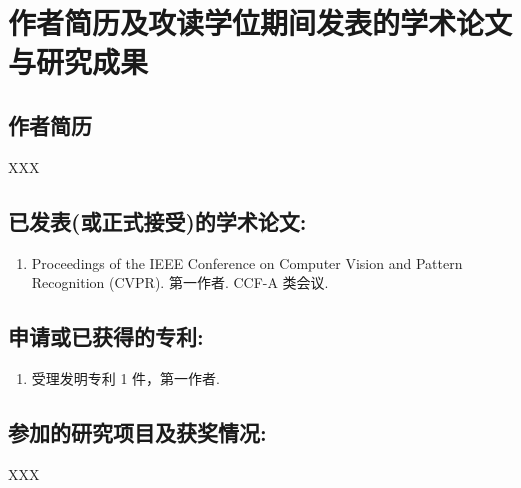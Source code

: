 \chapter{作者简历及攻读学位期间发表的学术论文与研究成果}

\section*{作者简历}
XXX

\section*{已发表(或正式接受)的学术论文:}
{
\setlist[enumerate]{}
\begin{enumerate}[nosep]
    \item Proceedings of the IEEE Conference on Computer Vision and Pattern Recognition (CVPR). 第一作者. CCF-A 类会议.
\end{enumerate}
}

\section*{申请或已获得的专利:}
{
\setlist[enumerate]{}
\begin{enumerate}[nosep]
    \item 受理发明专利 1 件，第一作者.
\end{enumerate}
}

\section*{参加的研究项目及获奖情况:}
XXX

\cleardoublepage[plain]%
